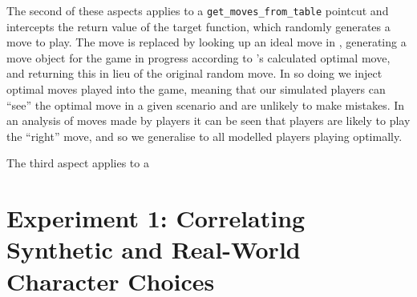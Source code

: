 The second of these aspects applies to a \lstinline{get_moves_from_table} pointcut and
intercepts the return value of the target function, which randomly generates a
move to play. The move is replaced by looking up an ideal move in
\cite{kavanagh2020}, generating a move object for the game in progress
according to \citeauthor{kavanagh2020}'s calculated optimal move, and returning this
in lieu of the original random move. In so doing we inject optimal moves played
into the game, meaning that our simulated players can ``see'' the optimal move
in a given scenario and are unlikely to make mistakes. In an analysis of moves
made by players it can be seen that players are likely to play the ``right''
move, and so we generalise to all modelled players playing optimally.

The third aspect applies to a \lstinline{}



\label{sec:experiment1}
\label{exp:rpglite-simple}
\section{Experiment 1: Correlating Synthetic and Real-World Character Choices}

